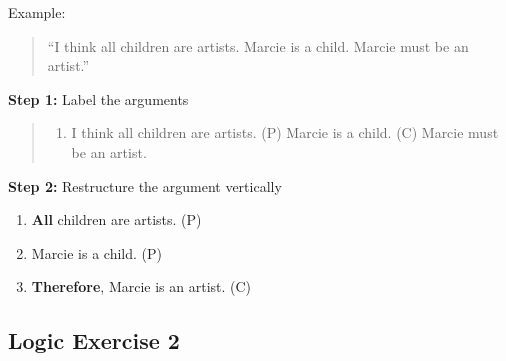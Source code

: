 \documentclass[
]{book}
\providecommand{\tightlist}{%
  \setlength{\itemsep}{0pt}\setlength{\parskip}{0pt}}
\begin{document}
\begin{reflect}
Example:

\begin{quote}
``I think all children are artists. Marcie is a child. Marcie must be an artist.''
\end{quote}

\textbf{Step 1:} Label the arguments

\begin{quote}
\begin{enumerate}
\def\labelenumi{(\Alph{enumi})}
\setcounter{enumi}{15}
\tightlist
\item
  I think all children are artists. (P) Marcie is a child. (C) Marcie must be an artist.
\end{enumerate}
\end{quote}

\textbf{Step 2:} Restructure the argument vertically

\begin{enumerate}
\def\labelenumi{\arabic{enumi}.}
\tightlist
\item
  \textbf{All} children are artists. (P)
\item
  Marcie is a child. (P)
\item
  \textbf{Therefore}, Marcie is an artist. (C)
\end{enumerate}
\end{reflect}

\hypertarget{logic-exercise-2-2}{%
\subsection*{Logic Exercise 2}\label{logic-exercise-2-2}}
\end{document}
